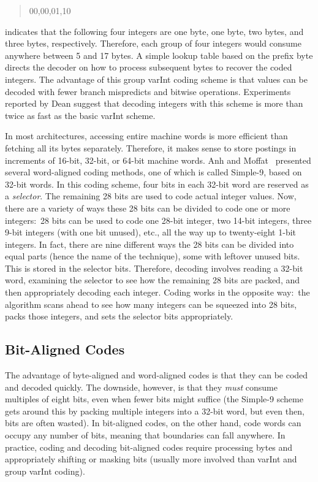 \begin{quote}
00,00,01,10
\end{quote}

\noindent indicates that the following four integers are one byte, one
byte, two bytes, and three bytes, respectively.  Therefore, each group
of four integers would consume anywhere between 5 and 17 bytes.  A
simple lookup table based on the prefix byte directs the decoder on
how to process subsequent bytes to recover the coded integers.  The
advantage of this group varInt coding scheme is that values can be
decoded with fewer branch mispredicts and bitwise operations.
Experiments reported by Dean suggest that decoding integers with this
scheme is more than twice as fast as the basic varInt scheme.

In most architectures, accessing entire machine words is more
efficient than fetching all its bytes separately.  Therefore, it makes
sense to store postings in increments of 16-bit, 32-bit, or 64-bit
machine words.  Anh and Moffat~\cite{Anh_Moffat_2005} presented
several word-aligned coding methods, one of which is called Simple-9,
based on 32-bit words.  In this coding scheme, four bits in each
32-bit word are reserved as a \emph{selector}.  The remaining 28 bits
are used to code actual integer values.  Now, there are a variety of
ways these 28 bits can be divided to code one or more integers:\ 28
bits can be used to code one 28-bit integer, two 14-bit integers,
three 9-bit integers (with one bit unused), etc., all the way up to
twenty-eight 1-bit integers.  In fact, there are nine different ways
the 28 bits can be divided into equal parts (hence the name of the
technique), some with leftover unused bits.  This is stored in the
selector bits.  Therefore, decoding involves reading a 32-bit word,
examining the selector to see how the remaining 28 bits are packed,
and then appropriately decoding each integer.  Coding works in the
opposite way:\ the algorithm scans ahead to see how many integers can
be squeezed into 28 bits, packs those integers, and sets the selector
bits appropriately.

\subsection{Bit-Aligned Codes}

The advantage of byte-aligned and word-aligned codes is that they can
be coded and decoded quickly.  The downside, however, is that they
\emph{must} consume multiples of eight bits, even when fewer bits might
suffice (the Simple-9 scheme gets around this by packing multiple
integers into a 32-bit word, but even then, bits are often wasted).
In bit-aligned codes, on the other hand, code words can occupy any
number of bits, meaning that boundaries can fall anywhere.  In
practice, coding and decoding bit-aligned codes require processing
bytes and appropriately shifting or masking bits (usually more
involved than varInt and group varInt coding).

